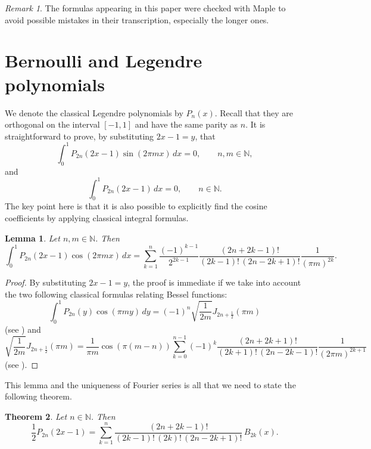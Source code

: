\documentclass[a4paper,reqno]{amsart}
\newcommand{\N}{\mathbb{N}}
\theoremstyle{plain}
\newtheorem{Teor}{Theorem}[section]
\newtheorem{Lema}[Teor]{Lemma}
\numberwithin{equation}{section}
\theoremstyle{remark}
\newtheorem*{Nota}{Remark}
\begin{document}
\begin{Nota} 
The formulas appearing in this paper were checked with Maple to avoid possible mistakes in their transcription, especially the longer ones.
\end{Nota}

\section{Bernoulli and Legendre polynomials}
\label{sec:BerLeg}

We denote the classical Legendre polynomials by $P_n(x)$. Recall that they are orthogonal on the interval $[-1,1]$ and have the same parity as $n.$ It is straightforward to prove, by substituting $2x-1 = y$, that
\[
  \int_0^1 P_{2n}(2x-1) \sin(2\pi mx)\,dx = 0,
  \qquad n,m\in\N,
\]
and
\[
  \int_0^1 P_{2n}(2x-1)\,dx = 0,
  \qquad n\in\N.
\]
The key point here is that it is also possible to explicitly find the cosine coefficients by applying classical integral formulas.

\begin{Lema} 
\label{Lema:Legpar}
Let $n,m\in\N$. Then
\[
  \int_0^1 P_{2n}(2x-1) \cos(2\pi mx)\,dx 
  = \sum_{k=1}^n \frac{(-1)^{k-1}}{2^{2k-1}} \frac{(2n+2k-1)!}{(2k-1)!\,(2n-2k+1)!} \frac{1}{(\pi m)^{2k}}.
\]
\end{Lema}

\begin{proof}
By substituting $2x-1 = y$, the proof is immediate if we take into account the two following classical formulas relating Bessel functions:
\[
  \int_0^1 P_{2n}(y) \cos(\pi my)\,dy 
  = (-1)^n \sqrt{\frac{1}{2m}} J_{2n+\frac{1}{2}}(\pi m) 
\]
(see \cite[formula 2.17.7-1, p.~433]{PBM}) and
\[
  \sqrt{\frac{1}{2m}} J_{2n+\frac{1}{2}}(\pi m) =
  \frac{1}{\pi m}\cos(\pi(m-n)) 
  \sum_{k=0}^{n-1}(-1)^k \frac{(2n+2k+1)!}{(2k+1)!\,(2n-2k-1)!} \frac{1}{(2\pi m)^{2k+1}}
\]
(see \cite[formula 10.1.8, p.~437]{AS}).
\end{proof}

This lemma and the uniqueness of Fourier series is all that we need to state the following theorem.

\begin{Teor} 
Let $n\in\N$. Then
\begin{equation}
\label{Legendrepar}
  \frac{1}{2}P_{2n}(2x-1) = \sum_{k=1}^n \frac{(2n+2k-1)!}{(2k-1)!\,(2k)!\,(2n-2k+1)!}\,B_{2k}(x).
\end{equation}
\end{Teor}
\end{document}

